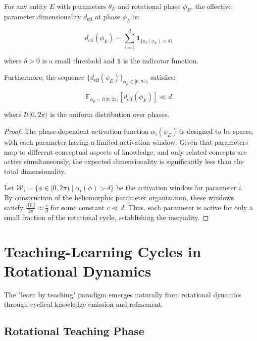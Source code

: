 \begin{theorem}
For any entity $E$ with parameters $\theta_E$ and rotational phase $\phi_E$, the effective parameter dimensionality $d_{\text{eff}}$ at phase $\phi_E$ is:

\begin{equation}
d_{\text{eff}}(\phi_E) = \sum_{i=1}^d \mathbf{1}_{\{\alpha_i(\phi_E) > \delta\}}
\end{equation}

where $\delta > 0$ is a small threshold and $\mathbf{1}$ is the indicator function.

Furthermore, the sequence $\{d_{\text{eff}}(\phi_E)\}_{\phi_E \in [0, 2\pi)}$ satisfies:

\begin{equation}
\mathbb{E}_{\phi_E \sim \mathcal{U}[0, 2\pi)}[d_{\text{eff}}(\phi_E)] \ll d
\end{equation}

where $\mathcal{U}[0, 2\pi)$ is the uniform distribution over phases.
\end{theorem}

\begin{proof}
The phase-dependent activation function $\alpha_i(\phi_E)$ is designed to be sparse, with each parameter having a limited activation window. Given that parameters map to different conceptual aspects of knowledge, and only related concepts are active simultaneously, the expected dimensionality is significantly less than the total dimensionality.

Let $\mathcal{W}_i = \{\phi \in [0, 2\pi) \mid \alpha_i(\phi) > \delta\}$ be the activation window for parameter $i$. By construction of the heliomorphic parameter organization, these windows satisfy $\frac{|\mathcal{W}_i|}{2\pi} \approx \frac{c}{d}$ for some constant $c \ll d$. Thus, each parameter is active for only a small fraction of the rotational cycle, establishing the inequality.
\end{proof}

\section{Teaching-Learning Cycles in Rotational Dynamics}

The "learn by teaching" paradigm emerges naturally from rotational dynamics through cyclical knowledge emission and refinement.

\subsection{Rotational Teaching Phase}

